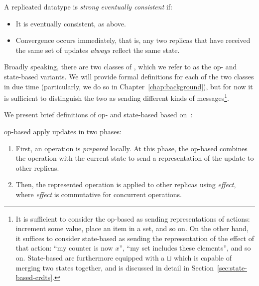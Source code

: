 \begin{definition}
  A replicated datatype is \textit{strong eventually consistent} if:
  \begin{itemize}
    \item It is eventually consistent, as above.
    \item Convergence occurs immediately, that is, any two replicas that have
      received the same set of updates \textit{always} reflect the same state.
  \end{itemize}
\end{definition}

Broadly speaking, there are two classes of \CRDTs, which we refer to as the op-
and state-based variants. We will provide formal definitions for each of the two
classes in due time (particularly, we do so in Chapter~\ref{chap:background}),
but for now it is sufficient to distinguish the two as sending different kinds
of messages\footnote{It is sufficient to consider the op-based \CRDT as sending
representations of actions: increment some value, place an item in a set, and so
on. On the other hand, it suffices to consider state-based \CRDTs as sending the
representation of the effect of that action: ``my counter is now $x$'', ``my set
includes these elements'', and so on. State-based \CRDTs are furthermore
equipped with a $\sqcup$ which is capable of merging two states together, and is
discussed in detail in Section~\ref{sec:state-based-crdts}.}.

We present brief definitions of op- and state-based \CRDTs based
on~\citep{baquero14}:

\begin{definition}
  op-based \CRDTs apply updates in two phases:
  \begin{enumerate}
    \item First, an operation is \textit{prepared} locally. At this phase, the
      op-based \CRDT combines the operation with the current state to send a
      representation of the update to other replicas.
    \item Then, the represented operation is applied to other replicas using
      \textit{effect}, where \textit{effect} is commutative for concurrent
      operations.
  \end{enumerate}
\end{definition}

